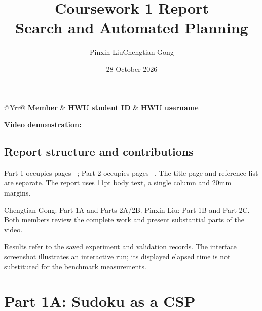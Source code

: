 \documentclass[11pt,a4paper]{article}
\title{Coursework 1 Report\\Search and Automated Planning}
\author{Pinxin Liu\quad Chengtian Gong\\\GroupName}
\date{28 October 2026}
\begin{document}
\begin{titlepage}
\maketitle\thispagestyle{plain}
\begin{center}\textbf{\ReportStatus}\end{center}
\begin{table}[H]\centering
\caption*{Group details}
\begin{tabularx}{\linewidth}{@{}Yrr@{}}
\toprule
\textbf{Member} & \textbf{HWU student ID} & \textbf{HWU username}\\
\midrule
\MemberRows
\bottomrule
\end{tabularx}
\end{table}
\medskip
\textbf{Video demonstration:} \VideoLink

\subsection*{Report structure and contributions}
Part 1 occupies pages \pageref{part1-start}--\pageref{part1-end}; Part 2 occupies pages \pageref{part2-start}--\pageref{part2-end}. The title page and reference list are separate. The report uses 11pt body text, a single column and 20mm margins.

Chengtian Gong: Part 1A and Parts 2A/2B. Pinxin Liu: Part 1B and Part 2C. Both members review the complete work and present substantial parts of the video.

Results refer to the saved experiment and validation records. The interface screenshot illustrates an interactive run; its displayed elapsed time is not substituted for the benchmark measurements.
\end{titlepage}

\section{Part 1A: Sudoku as a CSP}\label{part1-start}
\end{document}
